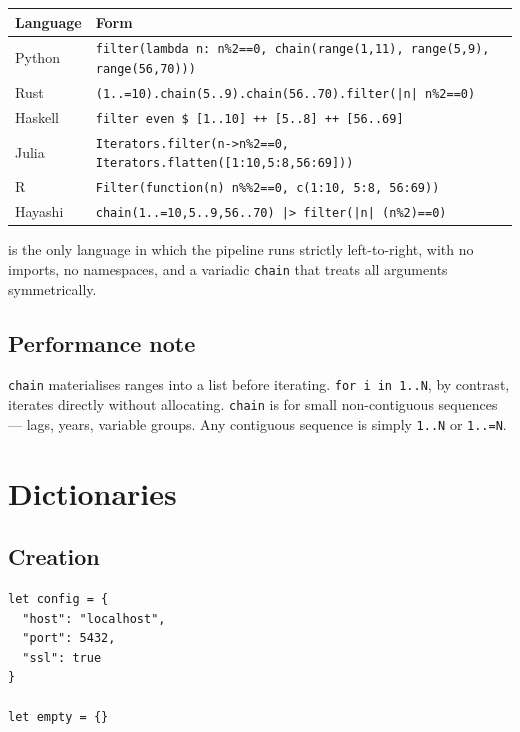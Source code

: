 \begin{center}
\begin{tabular}{ll}
\toprule
\textbf{Language} & \textbf{Form} \\
\midrule
Python  & \texttt{filter(lambda n: n\%2==0, chain(range(1,11), range(5,9), range(56,70)))} \\
Rust    & \texttt{(1..=10).chain(5..9).chain(56..70).filter(|n| n\%2==0)} \\
Haskell & \texttt{filter even \$ [1..10] ++ [5..8] ++ [56..69]} \\
Julia   & \texttt{Iterators.filter(n->n\%2==0, Iterators.flatten([1:10,5:8,56:69]))} \\
R       & \texttt{Filter(function(n) n\%\%2==0, c(1:10, 5:8, 56:69))} \\
\midrule
Hayashi & \texttt{chain(1..=10,5..9,56..70) |> filter(|n| (n\%2)==0)} \\
\bottomrule
\end{tabular}
\end{center}

\hayashi{} is the only language in which the pipeline runs strictly
left-to-right, with no imports, no namespaces, and a variadic
\lstinline{chain} that treats all arguments symmetrically.

\subsection{Performance note}

\lstinline{chain} materialises ranges into a list before iterating.
\lstinline{for i in 1..N}, by contrast, iterates directly without
allocating. \lstinline{chain} is for small non-contiguous sequences —
lags, years, variable groups. Any contiguous sequence is simply
\lstinline{1..N} or \lstinline{1..=N}.

\section{Dictionaries}

\subsection{Creation}

\begin{lstlisting}
let config = {
  "host": "localhost",
  "port": 5432,
  "ssl": true
}

let empty = {}
\end{lstlisting}


